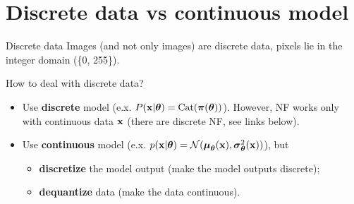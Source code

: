 \section{Discrete data vs continuous model}
\begin{frame}{Discrete data}
	Images {\color{gray}(and not only images)} are discrete data, pixels lie in the integer domain (\{0, 255\}). 
	\begin{block}{How to deal with discrete data?}
		\begin{itemize}
			\item Use \textbf{discrete} model (e.x. $P(\mathbf{x} | \boldsymbol{\theta}) = \text{Cat}(\boldsymbol{\pi}(\boldsymbol{\theta}))$). However, NF works only with continuous data $\mathbf{x}$ (there are discrete NF, see links below).
			\item Use \textbf{continuous} model (e.x. $p(\mathbf{x} | \boldsymbol{\theta}) = \mathcal{N}(\boldsymbol{\mu}_{\boldsymbol{\theta}}(\mathbf{x}), \boldsymbol{\sigma}_{\boldsymbol{\theta}}^2(\mathbf{x}))$), but
			\begin{itemize}
				\item \textbf{discretize} the model output (make the model outputs discrete);
				\item \textbf{dequantize} data (make the data continuous).
			\end{itemize}
		\end{itemize}
	\end{block}
\end{frame}
